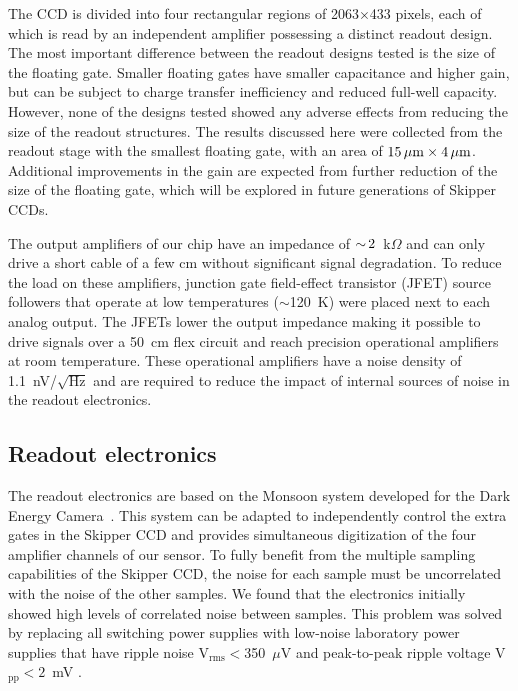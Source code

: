 \documentclass[aps,prl,reprint,superscriptaddress,floatfix,nofootinbib,showkeys,showpacs,preprintnumbers]{revtex4-1}
\begin{document}
The CCD is divided into four rectangular regions of 2063$\times$433 pixels, each of which is read by an independent amplifier possessing a distinct readout design.
The most important difference between the readout designs tested is the size of the floating gate. 
Smaller floating gates have smaller capacitance and higher gain, but can be subject to charge transfer inefficiency and reduced full-well capacity. 
However, none of the designs tested showed any adverse effects from reducing the size of the readout structures. 
The results discussed here were collected from the readout stage with the smallest floating gate, with an area of $15 \mathrm{\,\mu m} \times 4 \mathrm{\,\mu m}$.
Additional improvements in the gain are expected from further reduction of the size of the floating gate, which will be explored in future generations of Skipper CCDs.

The output amplifiers of our chip have an impedance of $ {\sim}\, 2$~k$\Omega$ and can only drive a short cable of a few cm without significant signal degradation. 
To reduce the load on these amplifiers, junction gate field-effect transistor (JFET) source followers that operate at low temperatures ($\sim$120~K) were placed next to each analog output. 
The JFETs lower the output impedance making it possible to drive signals over a 50~cm flex circuit and reach precision operational amplifiers at room temperature. 
These operational amplifiers have a noise density of 1.1~nV/$\sqrt{\textrm{Hz}}$ and are required to reduce the impact of internal sources of noise in the readout electronics.


\subsection{Readout electronics}

The readout electronics are based on the Monsoon system developed for the Dark Energy Camera~\cite{Mclean:2012pka,Flaugher:2015}. 
This system can be adapted to independently control the extra gates in the Skipper CCD and provides simultaneous digitization of the four amplifier channels of our sensor. 
To fully benefit from the multiple sampling capabilities of the Skipper CCD, the noise for each sample must be uncorrelated with the noise of the other samples. 
We found that the electronics initially showed high levels of correlated noise between samples. 
This problem was solved by replacing all switching power supplies with low-noise laboratory power supplies that have ripple noise V$_\textrm{rms}<$350~$\mu$V  and peak-to-peak ripple voltage V$_\textrm{pp}<2$~mV \citep{Haro:2016}.
\end{document}
